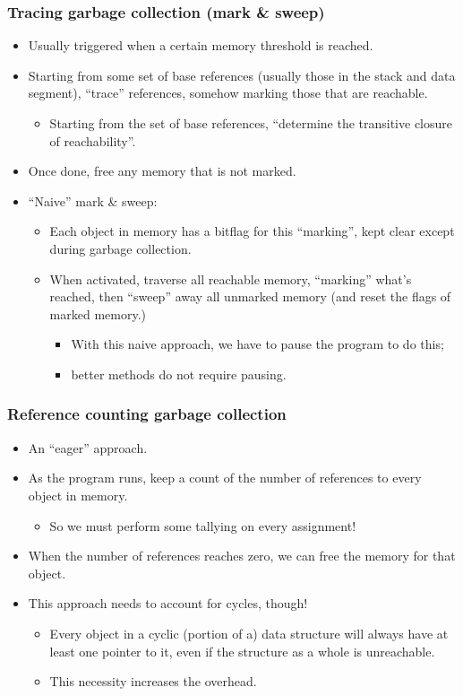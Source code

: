 \documentclass[11pt]{article}
\theoremstyle{definition}
\begin{document}
\subsubsection{Tracing garbage collection (mark \& sweep)}
\label{sec:org9152e54}
\begin{itemize}
\item Usually triggered when a certain memory threshold is reached.
\item Starting from some set of base references
(usually those in the stack and data segment),
“trace” references, somehow marking those that are reachable.
\begin{itemize}
\item Starting from the set of base references,
“determine the transitive closure of reachability”.
\end{itemize}
\item Once done, free any memory that is not marked.
\item “Naive” mark \& sweep:
\begin{itemize}
\item Each object in memory has a bitflag for this “marking”,
kept clear except during garbage collection.
\item When activated, traverse all reachable memory,
“marking” what's reached, then “sweep” away all unmarked memory
(and reset the flags of marked memory.)
\begin{itemize}
\item With this naive approach, we have to pause the program to do this;
\item better methods do not require pausing.
\end{itemize}
\end{itemize}
\end{itemize}

\subsubsection{Reference counting garbage collection}
\label{sec:org49057c0}
\begin{itemize}
\item An “eager” approach.
\item As the program runs, keep a count of the number of references
to every object in memory.
\begin{itemize}
\item So we must perform some tallying on every assignment!
\end{itemize}
\item When the number of references reaches zero, we can free the memory
for that object.
\item This approach needs to account for cycles, though!
\begin{itemize}
\item Every object in a cyclic (portion of a) data structure
will always have at least one pointer to it,
even if the structure as a whole is unreachable.
\item This necessity increases the overhead.
\end{itemize}
\end{itemize}
\end{document}
